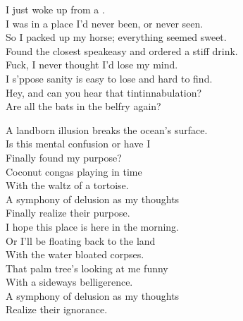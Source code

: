 
\label{album:phantom-island}





I just woke up from a . \\
I was in a place I'd never been, or never seen. \\
So I packed up my horse; everything seemed sweet. \\
Found the closest speakeasy and ordered a stiff drink. \\

Fuck, I never thought I'd lose my mind. \\
I s'ppose sanity is easy to lose and hard to find. \\
Hey, and can you hear that tintinnabulation? \\
Are all the bats in the belfry again? \\


A landborn illusion breaks the ocean's surface. \\
Is this mental confusion or have I \\
Finally found my purpose? \\
Coconut congas playing in time \\
With the waltz of a tortoise. \\
A symphony of delusion as my thoughts \\
Finally realize their purpose. \\

I hope this place is here in the morning. \\
Or I'll be floating back to the land \\
With the water bloated corpses. \\
That palm tree's looking at me funny \\
With a sideways belligerence. \\
A symphony of delusion as my thoughts \\
Realize their ignorance. \\


